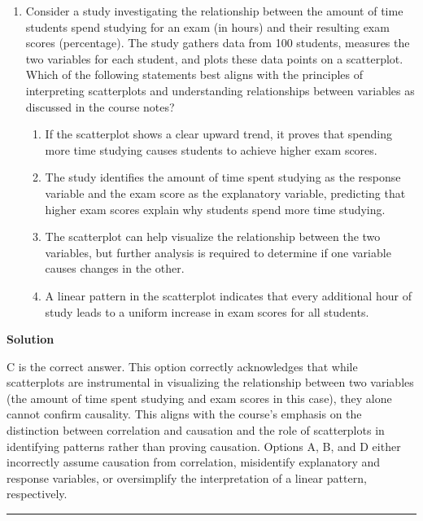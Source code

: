 \documentclass[
  letterpaper,
  DIV=11,
  numbers=noendperiod,
  oneside]{scrreprt}
\providecommand{\tightlist}{%
  \setlength{\itemsep}{0pt}\setlength{\parskip}{0pt}}\usepackage{longtable,booktabs,array}
\begin{document}
\begin{enumerate}
\def\labelenumi{\arabic{enumi}.}
\tightlist
\item
  Consider a study investigating the relationship between the amount of
  time students spend studying for an exam (in hours) and their
  resulting exam scores (percentage). The study gathers data from 100
  students, measures the two variables for each student, and plots these
  data points on a scatterplot. Which of the following statements best
  aligns with the principles of interpreting scatterplots and
  understanding relationships between variables as discussed in the
  course notes?

  \begin{enumerate}
  \def\labelenumii{\alph{enumii}.}
  \tightlist
  \item
    If the scatterplot shows a clear upward trend, it proves that
    spending more time studying causes students to achieve higher exam
    scores.
  \item
    The study identifies the amount of time spent studying as the
    response variable and the exam score as the explanatory variable,
    predicting that higher exam scores explain why students spend more
    time studying.
  \item
    The scatterplot can help visualize the relationship between the two
    variables, but further analysis is required to determine if one
    variable causes changes in the other.
  \item
    A linear pattern in the scatterplot indicates that every additional
    hour of study leads to a uniform increase in exam scores for all
    students.
  \end{enumerate}
\end{enumerate}

\textbf{Solution}

C is the correct answer. This option correctly acknowledges that while
scatterplots are instrumental in visualizing the relationship between
two variables (the amount of time spent studying and exam scores in this
case), they alone cannot confirm causality. This aligns with the
course's emphasis on the distinction between correlation and causation
and the role of scatterplots in identifying patterns rather than proving
causation. Options A, B, and D either incorrectly assume causation from
correlation, misidentify explanatory and response variables, or
oversimplify the interpretation of a linear pattern, respectively.

\begin{center}\rule{0.5\linewidth}{0.5pt}\end{center}
\end{document}
